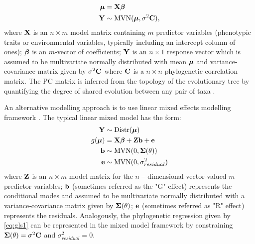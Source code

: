 \documentclass[12pt]{article}
\begin{document}
\begin{align}
{\boldsymbol \mu} & = {\mathbf X} {\boldsymbol \beta}  \label{eq:gls1} \\ 
{\mathbf Y} & \sim \textrm{MVN}({\boldsymbol \mu},\sigma^{2} {\mathbf C}), \label{eq:gls2}
\end{align}
where ${\mathbf X}$ is an $n \times m$ model matrix containing $m$ predictor variables (phenotypic traits or environmental variables, typically including an intercept column of ones); ${\boldsymbol \beta}$ is an $m$-vector of coefficients; ${\mathbf Y}$ is an $n \times 1$ response vector which is assumed to be multivariate normally distributed with mean ${\boldsymbol \mu}$ and variance-covariance matrix given by $\sigma^{2} {\mathbf C}$ where ${\mathbf C}$ is a $n \times n$ phylogenetic correlation matrix.
The PC matrix is inferred from the topology of the evolutionary tree by quantifying the degree of shared evolution between any pair of taxa \citep{garamszegi2014modern}.


An alternative modelling approach is to use linear mixed effects modelling framework \citep{lynch1991methods}.
The typical linear mixed model has the form:
\begin{align}
{\mathbf Y} & \sim \textrm{Distr}({\boldsymbol \mu}) \label{eq:glmm1} \\
g({\boldsymbol \mu}) & = {\mathbf X} {\boldsymbol \beta} + {\mathbf Z} {\mathbf b} + {\mathbf e} \label{eq:glmm2} \\
{\mathbf b} & \sim \textrm{MVN}(0, {\boldsymbol \Sigma}(\theta)) \label{eq:glmm3} \\
{\mathbf e} & \sim \textrm{MVN}(0, \sigma^2_{residual} \label{eq:glmm3})
\end{align}
where ${\mathbf Z}$ is an $n \times m$ model matrix for the $n$ -- dimensional vector-valued $m$ predictor variables; ${\mathbf b}$ (sometimes referred as the "G" effect) represents the conditional modes and assumed to be multivariate normally distributed with a variance-covariance matrix given by ${\boldsymbol \Sigma}(\theta)$; ${\mathbf e}$ (sometimes referred as "R" effect) represents the residuals.
Analogously, the phylogenetic regression given by \ref{eq:gls1} can be represented in the mixed model framework by constraining ${\boldsymbol \Sigma}(\theta) = \sigma^2 {\mathbf C}$ and $\sigma^2_{residual} = 0$.
\end{document}
